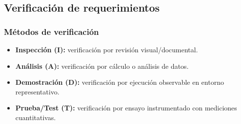 

\subsection{Verificación de requerimientos}

\subsubsection{Métodos de verificación}
\begin{itemize}
  \item \textbf{Inspección (I):} verificación por revisión visual/documental.
  \item \textbf{Análisis (A):} verificación por cálculo o análisis de datos.
  \item \textbf{Demostración (D):} verificación por ejecución observable en entorno representativo.
  \item \textbf{Prueba/Test (T):} verificación por ensayo instrumentado con mediciones cuantitativas.
\end{itemize}

